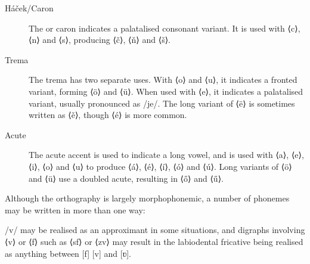 \documentclass[grammar]{subfiles}
\begin{document}
  \begin{description}
    \item[Háček/Caron] The  or caron indicates a palatalised consonant variant.  It is used with ⟨c⟩, ⟨n⟩ and ⟨s⟩, producing ⟨č⟩, ⟨ň⟩ and ⟨š⟩.
    \item[Trema] The trema has two separate uses.  With ⟨o⟩ and ⟨u⟩, it indicates a fronted variant, forming ⟨ö⟩ and ⟨ü⟩.  When used with ⟨e⟩, it indicates a palatalised variant, usually pronounced as /je/.  The long variant of ⟨ë⟩ is sometimes written as ⟨ě⟩, though ⟨é⟩ is more common. 

    \item[Acute] The acute accent is used to indicate a long vowel, and is used with ⟨a⟩, ⟨e⟩, ⟨i⟩, ⟨o⟩ and ⟨u⟩ to produce ⟨á⟩, ⟨é⟩, ⟨í⟩, ⟨ó⟩ and ⟨ú⟩.  Long variants of ⟨ö⟩ and ⟨ü⟩ use a doubled acute, resulting in ⟨ő⟩ and ⟨ű⟩. 
  \end{description}

  Although the orthography is largely morphophonemic, a number of phonemes may be written in more than one way:

  \begin{itemize*}
    \item /v/ may be realised as an approximant in some situations, and digraphs involving ⟨v⟩ or ⟨f⟩ such as ⟨sf⟩ or ⟨zv⟩ may result in the labiodental fricative being realised as anything between [f] [v] and [ʋ].
  \end{itemize*}
\end{document}
